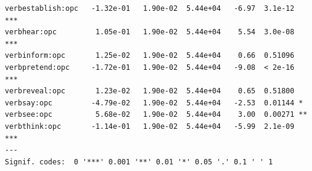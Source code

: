 \documentclass[10pt]{article}\usepackage[]{graphicx}\usepackage[]{color}
\makeatletter
\newenvironment{kframe}{%
 \def\at@end@of@kframe{}%
 \ifinner\ifhmode%
  \def\at@end@of@kframe{\end{minipage}}%
  \begin{minipage}{\columnwidth}%
 \fi\fi%
 \def\FrameCommand##1{\hskip\@totalleftmargin \hskip-\fboxsep
 \colorbox{shadecolor}{##1}\hskip-\fboxsep
     \hskip-\linewidth \hskip-\@totalleftmargin \hskip\columnwidth}%
 \MakeFramed {\advance\hsize-\width
   \@totalleftmargin\z@ \linewidth\hsize
   \@setminipage}}%
 {\par\unskip\endMakeFramed%
 \at@end@of@kframe}
\newenvironment{knitrout}{}{} %
\makeatother
\begin{document}
\begin{knitrout}
\begin{kframe}
\begin{verbatim}
verbestablish:opc   -1.32e-01   1.90e-02  5.44e+04   -6.97  3.1e-12 ***
verbhear:opc         1.05e-01   1.90e-02  5.44e+04    5.54  3.0e-08 ***
verbinform:opc       1.25e-02   1.90e-02  5.44e+04    0.66  0.51096    
verbpretend:opc     -1.72e-01   1.90e-02  5.44e+04   -9.08  < 2e-16 ***
verbreveal:opc       1.23e-02   1.90e-02  5.44e+04    0.65  0.51800    
verbsay:opc         -4.79e-02   1.90e-02  5.44e+04   -2.53  0.01144 *  
verbsee:opc          5.68e-02   1.90e-02  5.44e+04    3.00  0.00271 ** 
verbthink:opc       -1.14e-01   1.90e-02  5.44e+04   -5.99  2.1e-09 ***
---
Signif. codes:  0 '***' 0.001 '**' 0.01 '*' 0.05 '.' 0.1 ' ' 1
\end{verbatim}
\end{kframe}
\end{knitrout}

% 
% 
% 
% 
% 
% 
% 



\end{document}
